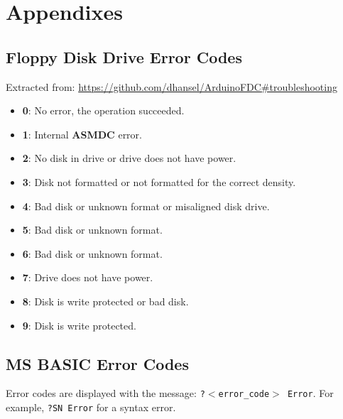 \documentclass[a4paper,11pt]{article}
\begin{document}
    \pagebreak
    \section{Appendixes}
    \label{sec:appendixes}

    \subsection{Floppy Disk Drive Error Codes}

    Extracted from: \url{https://github.com/dhansel/ArduinoFDC#troubleshooting}

    \begin{itemize}
        \item \textbf{0}: No error, the operation succeeded.
        \item \textbf{1}: Internal \textbf{ASMDC} error.
        \item \textbf{2}: No disk in drive or drive does not have power.
        \item \textbf{3}: Disk not formatted or not formatted for the correct
        density.
        \item \textbf{4}: Bad disk or unknown format or misaligned disk drive.
        \item \textbf{5}: Bad disk or unknown format.
        \item \textbf{6}: Bad disk or unknown format.
        \item \textbf{7}: Drive does not have power.
        \item \textbf{8}: Disk is write protected or bad disk.
        \item \textbf{9}: Disk is write protected.
    \end{itemize}

    \subsection{MS BASIC  Error Codes}

    Error codes are displayed with the message: \texttt{?$<$error\_code$>$ Error}.
    For example, \texttt{?SN Error} for a syntax error.
\end{document}
